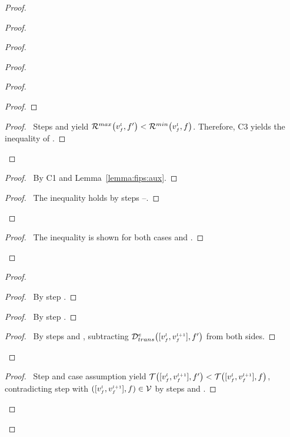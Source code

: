 \begin{proof}
\begin{proof}
\begin{proof}
\begin{proof}
\begin{proof}
\begin{proof}
                    \end{proof}
                    \qedstep
                    \begin{proof}
		      \pf\ Steps  and  yield $\Rmax{\v{l}{f},f'} < \Rmin{\v{l}{f},f}$.
                	Therefore, C3 yields the inequality of .
                    \end{proof}
                \end{proof}
                \begin{proof}
                    \pf\ By C1 and Lemma~\ref{lemma:fips:aux}.
                \end{proof}
                \qedstep
                \begin{proof}
                    \pf\ The inequality  holds by steps --.
                \end{proof}
            \end{proof}
            \qedstep
            \begin{proof}
                \pf\ The inequality  is shown for both cases  and .
            \end{proof}
        \end{proof}
        \begin{proof}
            \begin{proof}
        	\pf\ By step .
            \end{proof}
            \begin{proof}
        	\pf\ By step .
            \end{proof}
            \qedstep
            \begin{proof}
	      \pf\ By steps  and , subtracting $\eDtrans{\clink{l}{f},f'}$ from both sides.
            \end{proof}
        \end{proof}
        \qedstep
        \begin{proof}
	  \pf\ Step  and case assumption  yield $\T{\clink{l}{f}, f'} < \T{\clink{l}{f}, f}$, contradicting step  with $([v_{\scriptscriptstyle f}^{\scriptscriptstyle l}, v_{\scriptscriptstyle f}^{\scriptscriptstyle l+1}], f) \in \mathcal{V}$ by steps  and .

\end{proof}
\end{proof}
\end{proof}
